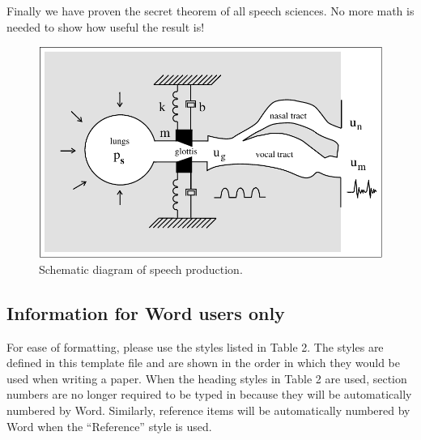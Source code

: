 \documentclass[a4paper]{article}
\begin{document}
Finally we have proven the secret theorem of all speech sciences. No more math is needed to show how useful the result is!

\begin{figure}[t]
  \centering
  \includegraphics[width=\linewidth]{figure.pdf}
  \caption{Schematic diagram of speech production.}
  \label{fig:speech_production}
\end{figure}

\subsection{Information for Word users only}

For ease of formatting, please use the styles listed in Table 2. The styles are defined in this template file and are shown in the order in which they would be used when writing a paper. When the heading styles in Table 2 are used, section numbers are no longer required to be typed in because they will be automatically numbered by Word. Similarly, reference items will be automatically numbered by Word when the ``Reference'' style is used.
\end{document}
